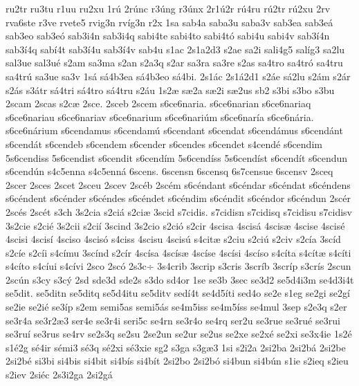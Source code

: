 {ru2tr
ru3tu
r1uu
ru2xu
1r^^fa
2r^^fanc
r3^^fang
r3^^fanx
2r1^^fa2r
r^^fa4ru
r^^fa2tr
r^^fa2xu
2rv
rva6ste
r3ve
rvete5
rvig3n
rv^^edg3n
r2x
1sa
sab4a
saba3u
saba3v
sab3ea
sab3e^^e1
sab3eo
sab3e^^f3
sab3i4n
sab3i4q
sabi4te
sabi4to
sabi4t^^f3
sabi4u
sabi4v
sab3^^ed4n
sab3^^ed4q
sab^^ed4t
sab3^^ed4u
sab3^^ed4v
sab4u
s1ac
2s1a2d3
s2ae
sa2i
sali4g5
sal^^edg3
sa2lu
sal3ue
sal3u^^e9
s2am
sa3ma
s2an
s2a3q
s2ar
sa3ra
sa3re
s2as
sa4tro
sa4tr^^f3
sa4tru
sa4tr^^fa
sa3ue
sa3v
1s^^e1
s^^e14b3ea
s^^e14b3eo
s^^e14bi.
2s1^^e1c
2s1^^e12d1
s2^^e1e
s^^e12lu
s2^^e1m
s2^^e1r
s2^^e1s
s3^^e1tr
s^^e14tri
s^^e14tro
s^^e14tru
s2^^e1u
1s2^^e6
s^^e62a
s^^e62i
s^^e62us
sb2
s3bi
s3bo
s3bu
2scam
2scas
s2c^^e6
2sce.
2sceb
2scem
s6ce6naria.
s6ce6narian
s6ce6nariaq
s6ce6nariau
s6ce6nariav
s6ce6narium
s6ce6nari^^fam
s6ce6nar^^eda
s6ce6n^^e1ria.
s6ce6n^^e1rium
s6cendamus
s6cendam^^fa
s6cendant
s6cendat
s6cend^^e1mus
s6cend^^e1nt
s6cend^^e1t
s6cendeb
s6cendem
s6cender
s6cendes
s6cendet
s4cend^^e9
s6cendim
5s6cendiss
5s6cendist
s6cendit
s6cend^^edm
5s6cend^^edss
5s6cend^^edst
s6cend^^edt
s6cendun
s6cend^^fan
s4c5enna
s4c5enn^^e1
6scens.
6scensn
6scensq
6s7censue
6scensv
2sceq
2scer
2sces
2scet
2sceu
2scev
2sc^^e9b
2sc^^e9m
s6c^^e9ndant
s6c^^e9ndar
s6c^^e9ndat
s6c^^e9ndens
s6c^^e9ndent
s6c^^e9nder
s6c^^e9ndes
s6c^^e9ndet
s6c^^e9ndim
s6c^^e9ndit
s6c^^e9ndor
s6c^^e9ndun
2sc^^e9r
2sc^^e9s
2sc^^e9t
s3ch
3s2cia
s2ci^^e1
s2ci^^e6
3scid
s7cidis.
s7cidisn
s7cidisq
s7cidisu
s7cidisv
3s2cie
s2ci^^e9
3s2cii
s2ci^^ed
3scind
3s2cio
s2ci^^f3
s2cir
4scisa
4scis^^e1
4scis^^e6
4scise
4scis^^e9
4scisi
4scis^^ed
4sciso
4scis^^f3
s4ciss
4scisu
4scis^^fa
s4cit^^e6
s2ciu
s2ci^^fa
s2civ
s2c^^eda
3sc^^edd
s2c^^ede
s2c^^edi
s4c^^edmu
3sc^^ednd
s2c^^edr
4sc^^edsa
4sc^^eds^^e6
4sc^^edse
4sc^^edsi
4sc^^edso
s4c^^edta
s4c^^edt^^e6
s4c^^edti
s4c^^edto
s4c^^edui
s4c^^edvi
2sco
2sc^^f3
2s3c^^f7
3s4crib
3scrip
s3cris
3scr^^edb
3scr^^edp
s3cr^^eds
2scun
2sc^^fan
s3cy
s3c^^fd
2sd
sde3d
sde2s
s3do
sd4or
1se
se3b
3sec
se3d2
se5d4i3m
se4d3i4t
se5dit.
se5ditn
se5ditq
se5d4itu
se5ditv
sed^^ed4t
se4d5^^edti
sed4o
se2e
s1eg
se2gi
se2g^^ed
se2ie
se2i^^e9
se3^^edp
s2em
semi5as
semi5^^e1s
se4m5iss
se4m5^^edss
se4mul
3sep
s2e3q
s2er
se3r4a
se3r2^^e63
ser4e
se3r4i
seri5c
se4rn
se3r4o
se4rq
ser2u
se3rue
se3ru^^e9
se3rui
se3ru^^ed
se3rus
se4rv
se2s3q
se2su
2se2un
se2ur
se2us
se2xe
se2x^^e9
se2xi
se3x4ie
1s2^^e9
s1^^e92g
s^^e94ir
s^^e9mi3
s^^e93q
s^^e92xi
s^^e93xie
sg2
s3ga
s3g^^e63
1si
s2i2a
2si2ba
2si2b^^e1
2si2be
2si2b^^e9
si3bi
si4bis
si4bit
si4b^^eds
si4b^^edt
2si2bo
2si2b^^f3
si4bun
si4b^^fan
s1ie
s2ieq
s2ieu
s2iev
2si^^e9c
2s3i2ga
2si2g^^e1
}
